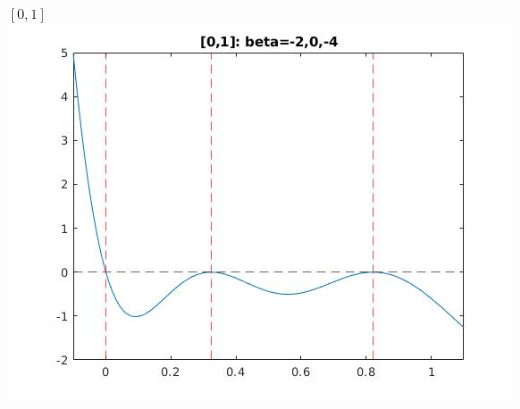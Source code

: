\documentclass[11pt]{beamer}
\begin{document}
\begin{frame}{$[0,1]$}
\includegraphics[scale=0.2]{quadplots/01_4.jpg}
\end{frame}
\end{document}
